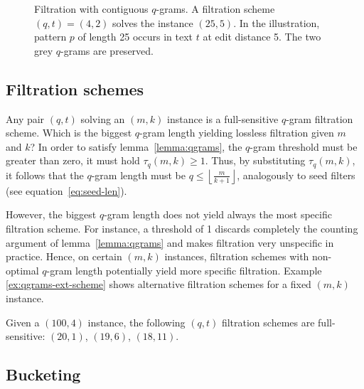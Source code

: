 \begin{figure}[h]
\begin{center}
\caption[Filtration with contiguous $q$-grams]{Filtration with contiguous $q$-grams. A filtration scheme $(q,t) = (4,2)$ solves the instance $(25,5)$. In the illustration, pattern $p$ of length 25 occurs in text $t$ at edit distance 5. The two grey $q$-grams are preserved.}
\label{fig:qgrams-ext}

\end{center}
\end{figure}

\subsection{Filtration schemes}

Any pair $(q,t)$ solving an $(m,k)$ instance is a full-sensitive $q$-gram filtration scheme.
Which is the biggest $q$-gram length yielding lossless filtration given $m$ and $k$?
In order to satisfy lemma~\ref{lemma:qgrams}, the $q$-gram threshold must be greater than zero, \ie it must hold $\tau_q(m,k) \geq 1$.
Thus, by substituting $\tau_q(m,k)$, it follows that the $q$-gram length must be $q \leq \left \lfloor \frac{m}{k+1} \right \rfloor$, analogously to seed filters (see equation~\ref{eq:seed-len}).

However, the biggest $q$-gram length does not yield always the most specific filtration scheme.
For instance, a threshold of 1 discards completely the counting argument of lemma~\ref{lemma:qgrams} and makes filtration very unspecific in practice.
Hence, on certain $(m,k)$ instances, filtration schemes with non-optimal $q$-gram length potentially yield more specific filtration.
Example \ref{ex:qgrams-ext-scheme} shows alternative filtration schemes for a fixed $(m,k)$ instance.

\begin{example}
\label{ex:qgrams-ext-scheme}
Given a $(100,4)$ instance, the following $(q,t)$ filtration schemes are full-sensitive:
$(20,1)$, $(19,6)$, $(18,11)$.
\end{example}

\subsection{Bucketing}

